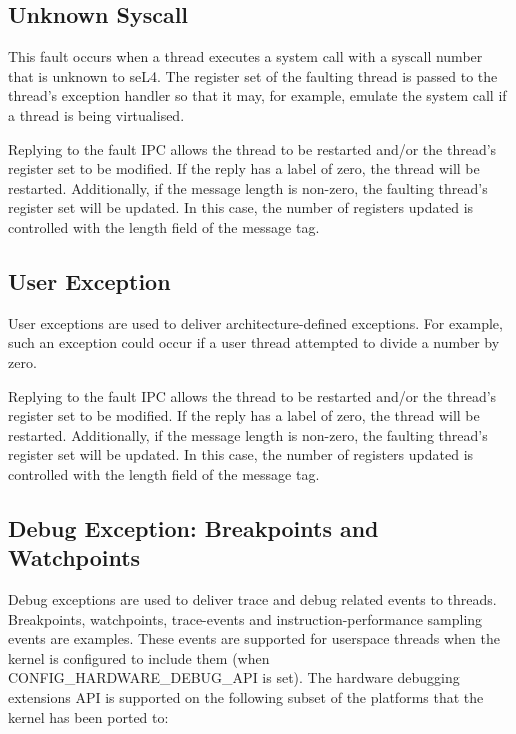 \subsection{Unknown Syscall}
\label{sec:unknown-syscall}

This fault occurs when a thread executes a system call with a syscall
number that is unknown to seL4.
The register set
of the faulting thread is passed to the thread's exception handler so that it
may, for example, emulate the system call if a thread is being
virtualised.

Replying to the fault IPC allows the thread to be restarted
and/or the thread's register set to be modified. If the reply has
a label of zero, the thread will be restarted. Additionally, if the
message length is non-zero, the faulting thread's register set will be
updated. In this case, the number of
registers updated is controlled with the length field of the message
tag.

\subsection{User Exception}

User exceptions are used to deliver architecture-defined exceptions. For
example, such an exception could occur if a user thread attempted to
divide a number by zero.

Replying to the fault IPC allows the thread to be restarted
and/or the thread's register set to be modified. If the reply has
a label of zero, the thread will be restarted. Additionally, if the
message length is non-zero, the faulting thread's register set will be
updated. In this case, the number of
registers updated is controlled with the length field of the message
tag.

\subsection{Debug Exception: Breakpoints and Watchpoints}
\label{sec:debug_exceptions}

Debug exceptions are used to deliver trace and debug related events to threads.
Breakpoints, watchpoints, trace-events and instruction-performance sampling
events are examples. These events are supported for userspace threads when the kernel
is configured to include them (when CONFIG\_HARDWARE\_DEBUG\_API is set). The hardware
debugging extensions API is supported on the following subset of the platforms that the
kernel has been ported to:

